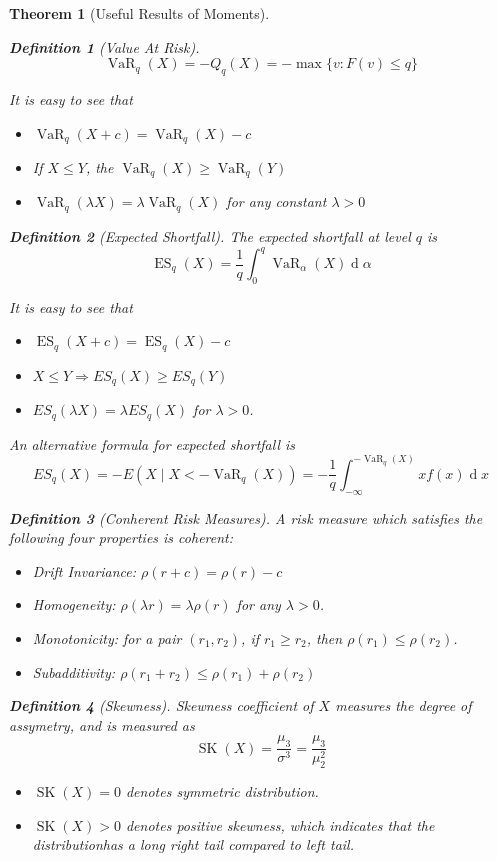 \documentclass[11pt]{article}
\newtheorem{definition}{Definition}[section]
\newtheorem{theorem}{Theorem}[section]
\theoremstyle{definition}
\DeclareMathOperator{\diff}{d}
\DeclareMathOperator{\VaR}{VaR}
\DeclareMathOperator{\ES}{ES}
\DeclareMathOperator{\SK}{SK}
\begin{document}
\begin{theorem}[Useful Results of Moments]
\begin{definition}[Value At Risk]
\[
\VaR_q(X)=-Q_q(X)=-\max\{v:F(v)\leq q\}
\]
\end{definition}
It is easy to see that
\begin{itemize}
  \item $\VaR_q(X+c)=\VaR_q(X)-c$
  \item If $X\leq Y$, the $\VaR_q(X)\geq \VaR_q(Y)$
  \item $\VaR_q(\lambda X)=\lambda \VaR_q(X)$ for any constant $\lambda > 0$
\end{itemize}
\begin{definition}[Expected Shortfall]
\normalfont The expected shortfall at level $q$ is
\[
\ES_q(X)=\frac{1}{q}\int_0^q\VaR_\alpha(X)\diff \alpha
\]
\end{definition}
It is easy to see that
\begin{itemize}
  \item $\ES_q(X+c)=\ES_q(X)-c$
  \item $X\leq Y\Rightarrow ES_q(X)\geq ES_q(Y)$
  \item $ES_q(\lambda X)=\lambda ES_q(X)$ for $\lambda>0$.
\end{itemize}
An alternative formula for expected shortfall is
\[
ES_q(X)=-E(X\mid X<-\VaR_q(X))=-\frac{1}{q}\int_{-\infty}^{-\VaR_q(X)}xf(x)\diff x
\]
\begin{definition}[Conherent Risk Measures]
\normalfont A risk measure which satisfies the following four properties is coherent:
\begin{itemize}
  \item Drift Invariance: $\rho(r+c)=\rho(r)-c$
  \item Homogeneity: $\rho(\lambda r)=\lambda\rho(r)$ for any $\lambda>0$.
  \item Monotonicity: for a pair $(r_1, r_2)$, if $r_1\geq r_2$, then $\rho(r_1)\leq \rho(r_2)$.
  \item Subadditivity: $\rho(r_1+r_2)\leq \rho(r_1)+\rho(r_2)$
\end{itemize}
\end{definition}
\begin{definition}[Skewness]
\normalfont Skewness coefficient of $X$ measures the degree of assymetry, and is measured as
\[
\SK(X) = \frac{\mu_3}{\sigma^3} = \frac{\mu_3}{\mu_2^2}
\]
\begin{itemize}
  \item $\SK(X)=0$ denotes symmetric distribution.
  \item $\SK(X)>0$ denotes positive skewness, which indicates that the distributionhas a long right tail compared to left tail.

\end{itemize}
\end{definition}
\end{theorem}
\end{document}
